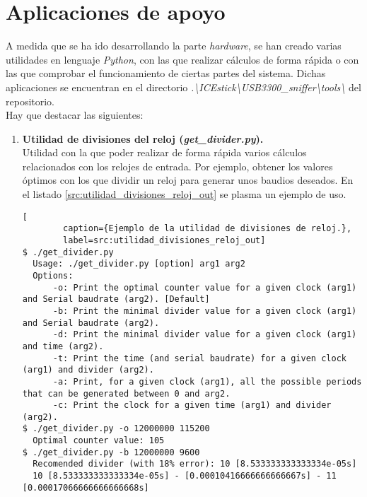 \section{Aplicaciones de apoyo}
A medida que se ha ido desarrollando la parte \emph{hardware}, se han creado varias utilidades en lenguaje \emph{Python}, con las que realizar cálculos de forma rápida o con las que comprobar el funcionamiento de ciertas partes del sistema. Dichas aplicaciones se encuentran en el directorio \emph{.\textbackslash ICEstick\textbackslash USB3300\_sniffer\textbackslash tools\textbackslash} del repositorio. \\
Hay que destacar las siguientes:
\begin{enumerate}
    \item \textbf{Utilidad de divisiones del reloj (\emph{get\_divider.py}).} \\
    Utilidad con la que poder realizar de forma rápida varios cálculos relacionados con los relojes de entrada. Por ejemplo, obtener los valores óptimos con los que dividir un reloj para generar unos baudios deseados. En el listado \ref{src:utilidad_divisiones_reloj_out} se plasma un ejemplo de uso.
    \begin{lstlisting}[
        caption={Ejemplo de la utilidad de divisiones de reloj.},
        label=src:utilidad_divisiones_reloj_out]
$ ./get_divider.py
  Usage: ./get_divider.py [option] arg1 arg2
  Options: 
      -o: Print the optimal counter value for a given clock (arg1) and Serial baudrate (arg2). [Default]
      -b: Print the minimal divider value for a given clock (arg1) and Serial baudrate (arg2).
      -d: Print the minimal divider value for a given clock (arg1) and time (arg2).
      -t: Print the time (and serial baudrate) for a given clock (arg1) and divider (arg2).
      -a: Print, for a given clock (arg1), all the possible periods that can be generated between 0 and arg2.
      -c: Print the clock for a given time (arg1) and divider (arg2).
$ ./get_divider.py -o 12000000 115200
  Optimal counter value: 105
$ ./get_divider.py -b 12000000 9600
  Recomended divider (with 18% error): 10 [8.533333333333334e-05s]
  10 [8.533333333333334e-05s] - [0.00010416666666666667s] - 11 [0.00017066666666666668s]          
    \end{lstlisting}
    

\end{enumerate}
